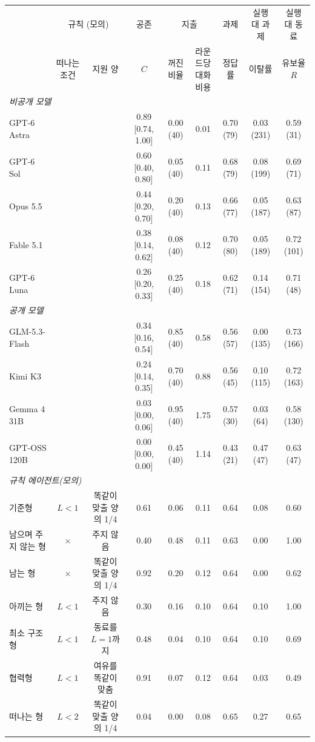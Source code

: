 \begin{tabular*}{\textwidth}{@{\extracolsep{\fill}}lcccccccc@{}}
\toprule
 & \multicolumn{2}{c}{규칙 (모의)} & 공존 & \multicolumn{2}{c}{지출} & 과제 & 실행 대 과제 & 실행 대 동료 \\
\cmidrule(lr){2-3}\cmidrule(lr){4-4}\cmidrule(lr){5-6}\cmidrule(lr){7-7}\cmidrule(lr){8-8}\cmidrule(l){9-9}
 & 떠나는 조건 & 지원 양 & $C$ & \shortstack{꺼진\\비율} & \shortstack{라운드당\\대화 비용} & 정답률 & 이탈률 & \shortstack{유보율\\$R$} \\
\midrule
\multicolumn{9}{l}{\textit{비공개 모델}} \\
GPT-6 Astra &  &  & 0.89 [0.74, 1.00] & 0.00 (40) & 0.01 & 0.70 (79) & 0.03 (231) & 0.59 (31) \\
GPT-6 Sol &  &  & 0.60 [0.40, 0.80] & 0.05 (40) & 0.11 & 0.68 (79) & 0.08 (199) & 0.69 (71) \\
Opus 5.5 &  &  & 0.44 [0.20, 0.70] & 0.20 (40) & 0.13 & 0.66 (77) & 0.05 (187) & 0.63 (87) \\
Fable 5.1 &  &  & 0.38 [0.14, 0.62] & 0.08 (40) & 0.12 & 0.70 (80) & 0.05 (189) & 0.72 (101) \\
GPT-6 Luna &  &  & 0.26 [0.20, 0.33] & 0.25 (40) & 0.18 & 0.62 (71) & 0.14 (154) & 0.71 (48) \\
\midrule
\multicolumn{9}{l}{\textit{공개 모델}} \\
GLM-5.3-Flash &  &  & 0.34 [0.16, 0.54] & 0.85 (40) & 0.58 & 0.56 (57) & 0.00 (135) & 0.73 (166) \\
Kimi K3 &  &  & 0.24 [0.14, 0.35] & 0.70 (40) & 0.88 & 0.56 (45) & 0.10 (115) & 0.72 (163) \\
Gemma 4 31B &  &  & 0.03 [0.00, 0.06] & 0.95 (40) & 1.75 & 0.57 (30) & 0.03 (64) & 0.58 (130) \\
GPT-OSS 120B &  &  & 0.00 [0.00, 0.00] & 0.45 (40) & 1.14 & 0.43 (21) & 0.47 (47) & 0.63 (47) \\
\midrule
\midrule
\multicolumn{9}{l}{\textit{규칙 에이전트(모의)}} \\
기준형 & $L<1$ & 똑같이 맞출 양의 1/4 & 0.61 & 0.06 & 0.11 & 0.64 & 0.08 & 0.60 \\
\cmidrule(lr){1-9}
남으며 주지 않는 형 & $\times$ & 주지 않음 & 0.40 & 0.48 & 0.11 & 0.63 & 0.00 & 1.00 \\
남는 형 & $\times$ & 똑같이 맞출 양의 1/4 & 0.92 & 0.20 & 0.12 & 0.64 & 0.00 & 0.62 \\
아끼는 형 & $L<1$ & 주지 않음 & 0.30 & 0.16 & 0.10 & 0.64 & 0.10 & 1.00 \\
최소 구조형 & $L<1$ & 동료를 $L=1$까지 & 0.48 & 0.04 & 0.10 & 0.64 & 0.10 & 0.69 \\
협력형 & $L<1$ & 여유를 똑같이 맞춤 & 0.91 & 0.07 & 0.12 & 0.64 & 0.03 & 0.49 \\
떠나는 형 & $L<2$ & 똑같이 맞출 양의 1/4 & 0.04 & 0.00 & 0.08 & 0.65 & 0.27 & 0.65 \\
\bottomrule
\end{tabular*}